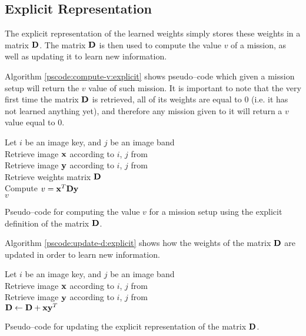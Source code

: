 \subsection{Explicit Representation} \label{subsect:meth:explicit}

The explicit representation of the learned weights simply stores these weights in a matrix $\boldsymbol{\mathbf{D}}$. The matrix $\boldsymbol{\mathbf{D}}$ is then used to compute the value $v$ of a mission, as well as updating it to learn new information.

Algorithm \ref{pscode:compute-v:explicit} shows pseudo--code which given a mission setup will return the $v$ value of such mission. It is important to note that the very first time the matrix $\boldsymbol{\mathbf{D}}$ is retrieved, all of its weights are equal to $0$ (i.e. it has not learned anything yet), and therefore any mission given to it will return a $v$ value equal to $0$.

\vspace{0.4cm}
\begin{algorithm}[H]
    \SetAlgoLined
         {
            Let $i$ be an image key, and $j$ be an image band \\
            Retrieve image $\boldsymbol{\mathbf{x}}$ according to $i$, $j$ from \usno \\
            Retrieve image $\boldsymbol{\mathbf{y}}$ according to $i$, $j$ from \panstarrs \\
            Retrieve weights matrix $\boldsymbol{\mathbf{D}}$ \\
            Compute $v = \boldsymbol{\mathbf{x}}^T \boldsymbol{\mathbf{D}} \boldsymbol{\mathbf{y}}$ \\
            \Return $v$
        }
    \caption{Pseudo--code for computing the value $v$ for a mission setup using the explicit definition of the matrix $\boldsymbol{\mathbf{D}}$.}
    \label{pscode:compute-v:explicit}
\end{algorithm}
\vspace{0.4cm}

Algorithm \ref{pscode:update-d:explicit} shows how the weights of the matrix $\boldsymbol{\mathbf{D}}$ are updated in order to learn new information.

\vspace{0.4cm}
\begin{algorithm}[H]
    \SetAlgoLined
         {
            Let $i$ be an image key, and $j$ be an image band \\
            Retrieve image $\boldsymbol{\mathbf{x}}$ according to $i$, $j$ from \usno \\
            Retrieve image $\boldsymbol{\mathbf{y}}$ according to $i$, $j$ from \panstarrs \\
            $\boldsymbol{\mathbf{D}} \gets \boldsymbol{\mathbf{D}} + \boldsymbol{\mathbf{x}}\boldsymbol{\mathbf{y}}^T$ \\
        }
    \caption{Pseudo--code for updating the explicit representation of the matrix $\boldsymbol{\mathbf{D}}$.}
    \label{pscode:update-d:explicit}
\end{algorithm}
\vspace{0.4cm}

